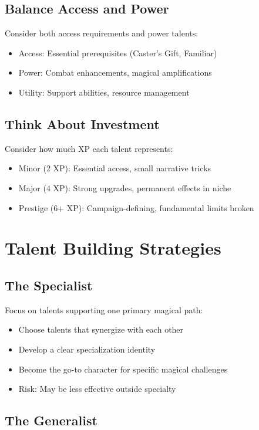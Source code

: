 \documentclass[11pt,twoside,openany]{book}
\begin{document}
\subsection*{Balance Access and Power}

Consider both access requirements and power talents:
\begin{itemize}
\item Access: Essential prerequisites (Caster's Gift, Familiar)
\item Power: Combat enhancements, magical amplifications
\item Utility: Support abilities, resource management
\end{itemize}

\subsection*{Think About Investment}

Consider how much XP each talent represents:
\begin{itemize}
\item Minor (2 XP): Essential access, small narrative tricks
\item Major (4 XP): Strong upgrades, permanent effects in niche
\item Prestige (6+ XP): Campaign-defining, fundamental limits broken
\end{itemize}

\section*{Talent Building Strategies} 

\subsection*{The Specialist}

Focus on talents supporting one primary magical path:
\begin{itemize}
\item Choose talents that synergize with each other
\item Develop a clear specialization identity
\item Become the go-to character for specific magical challenges
\item Risk: May be less effective outside specialty
\end{itemize}

\subsection*{The Generalist}
\end{document}
